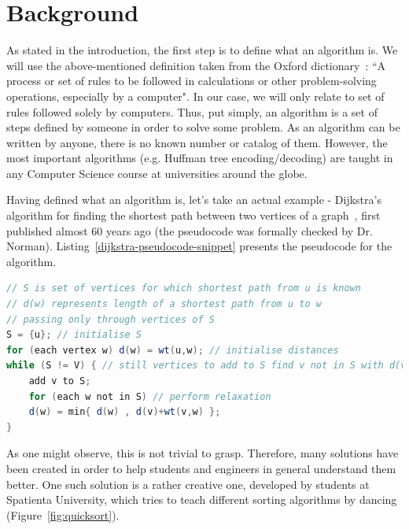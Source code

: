 \documentclass{l4proj}
\begin{document}

\chapter{Background}
\label{background}

As stated in the introduction, the first step is to define what an algorithm is. We will use the above-mentioned definition taken from the Oxford
dictionary~\cite{oxford-dict}: ``A process or set of rules to be followed in calculations or other problem-solving operations, especially by a computer". In our case, we will only relate to set of rules followed solely by computers. Thus, put simply, an algorithm is a set of steps defined by someone in order to solve some problem. As an algorithm can be written by anyone, there is no known number or catalog of them. However, the most important algorithms (e.g. Huffman tree encoding/decoding) are taught in any Computer Science course at universities around the globe.

Having defined what an algorithm is, let's take an actual example - Dijkstra's algorithm for finding the shortest path
between two vertices of a graph~\cite{dijkstra-shortest-path}, first published almost 60 years ago (the pseudocode was formally
checked by Dr. Norman). Listing~\ref{dijkstra-pseudocode-snippet} presents the pseudocode for the algorithm.

\begin{lstlisting}[language={Java}, label={dijkstra-pseudocode-snippet}, caption={Pseudocode for Dijkstra's shortest
path algorithm.}]
// S is set of vertices for which shortest path from u is known
// d(w) represents length of a shortest path from u to w
// passing only through vertices of S
S = {u}; // initialise S
for (each vertex w) d(w) = wt(u,w); // initialise distances
while (S != V) { // still vertices to add to S find v not in S with d(v) minimum;
	add v to S;
	for (each w not in S) // perform relaxation
	d(w) = min{ d(w) , d(v)+wt(v,w) };
}
\end{lstlisting}

As one might observe, this is not trivial to grasp. Therefore, many solutions have been created in order to help
students and engineers in general understand them better. One such solution is a rather creative one, developed by
students at Spatienta University, which tries to teach different sorting algorithms by dancing
(Figure~\ref{fig:quicksort}).
\end{document}
